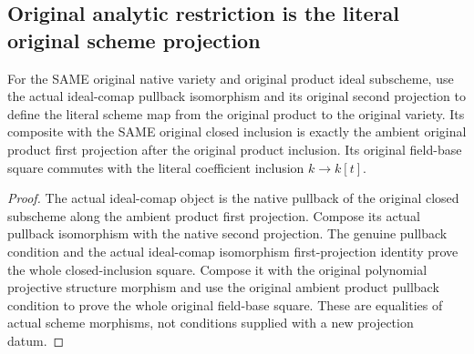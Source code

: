 \subsection{Original analytic restriction is the literal original scheme projection}

\begin{definition}
\label{local:actual-original-product-scheme-projection}
\leanok
{}
For the SAME original native variety and original product ideal subscheme,
use the actual ideal-comap pullback isomorphism and its original second
projection to define the literal scheme map from the original product to
the original variety. Its composite with the SAME original closed
inclusion is exactly the ambient original product first projection after
the original product inclusion. Its original field-base square commutes
with the literal coefficient inclusion $k\to k[t]$.
\end{definition}
\begin{proof}
The actual ideal-comap object is the native pullback of the original
closed subscheme along the ambient product first projection. Compose
its actual pullback isomorphism with the native second projection.
The genuine pullback condition and the actual ideal-comap isomorphism
first-projection identity prove the whole closed-inclusion square.
Compose it with the original polynomial projective structure morphism
and use the original ambient product pullback condition to prove the
whole original field-base square. These are equalities of actual scheme
morphisms, not conditions supplied with a new projection datum.
\end{proof}

